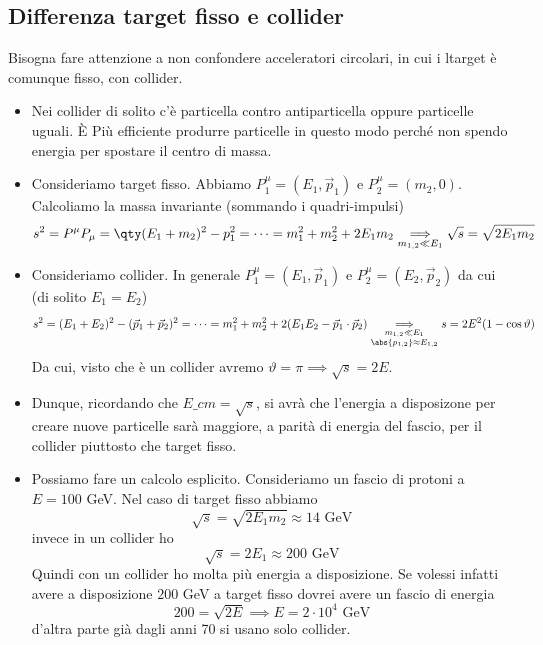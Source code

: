 \subsection{Differenza target fisso e collider}
Bisogna fare attenzione a non confondere acceleratori circolari, in cui i ltarget è comunque fisso, con collider.
\begin{itemize}
    \item Nei collider di solito c'è particella contro antiparticella oppure particelle uguali. È Più efficiente produrre particelle in questo modo perché non spendo energia per spostare il centro di massa.
    \item Consideriamo target fisso. Abbiamo $P^\mu_1=(E_1,\vec p_1)$ e $P^\mu_2=(m_2,0)$. Calcoliamo la massa invariante (sommando i quadri-impulsi)
    \begin{equation*}
        s^2=P^\mu P_\mu=\qty(E_1+m_2)^2-p_1^2=\dots=m_1^2+m_2^2+2E_1m_2 \underset{m_{1,2}\ll E_1}{\implies} \sqrt s=\sqrt{2E_1m_2}
    \end{equation*}
    \item Consideriamo collider. In generale $P^\mu_1=(E_1,\vec p_1)$ e $P^\mu_2=(E_2,\vec p_2)$ da cui (di solito $E_1=E_2$)
    \begin{equation*}
        s^2=(E_1+E_2)^2-(\vec p_1+\vec p_2)^2=\dots=m_1^2+m_2^2+2(E_1E_2-\vec p_1\cdot \vec p_2)\underset{
            \begin{subarray}{c}
                m_{1,2}\ll E_1\\
                \abs{p_{1,2}}\approx E_{1,2}
             \end{subarray}}{\implies}
        s=2E^2(1-\cos\vartheta)
    \end{equation*}
    Da cui, visto che è un collider avremo $\vartheta=\pi\implies \sqrt s=2E$.
    \item Dunque, ricordando che $E\_{cm}=\sqrt s$, si avrà che l'energia a disposizone per creare nuove particelle sarà maggiore, a parità di energia del fascio, per il collider piuttosto che target fisso. 
    \item Possiamo fare un calcolo esplicito. Consideriamo un fascio di protoni a $E=100$ GeV. Nel caso di target fisso abbiamo
    \begin{equation*}
        \sqrt s=\sqrt{2E_1m_2}\approx 14\text{ GeV}
    \end{equation*}
    invece in un collider ho 
    \begin{equation*}
        \sqrt s=2E_1\approx 200\text{ GeV}
    \end{equation*}
    Quindi con un collider ho molta più energia a disposizione. Se volessi infatti avere a disposizione $200$ GeV a target fisso dovrei avere un fascio di energia
    \begin{equation*}
        200=\sqrt{2E}\implies E=2\cdot10^4\text{ GeV}
    \end{equation*}
    d'altra parte già dagli anni 70 si usano solo collider.
\end{itemize}
